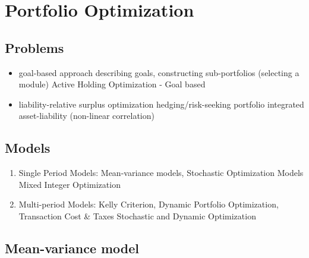 \documentclass[11pt, openany]{book}              %
\begin{document}
 
\section{Portfolio Optimization}

\subsection{Problems}

\begin{itemize}
	\item goal-based approach
        \subitem describing goals, constructing sub-portfolios (selecting a module)
        \subitem Active Holding Optimization - Goal based
	 \item liability-relative
         \subitem surplus optimization
        \subitem hedging/risk-seeking portfolio
         \subitem integrated asset-liability (non-linear correlation)
\end{itemize}

\subsection{Models}

\begin{enumerate}
	\item Single Period Models: Mean-variance models, Stochastic Optimization Models
		\subitem  Mixed Integer Optimization
	\item Multi-period Models: Kelly Criterion, Dynamic Portfolio Optimization, Transaction Cost \& Taxes
		\subitem  Stochastic and Dynamic Optimization
\end{enumerate}

\subsection{Mean-variance model}
\end{document}
